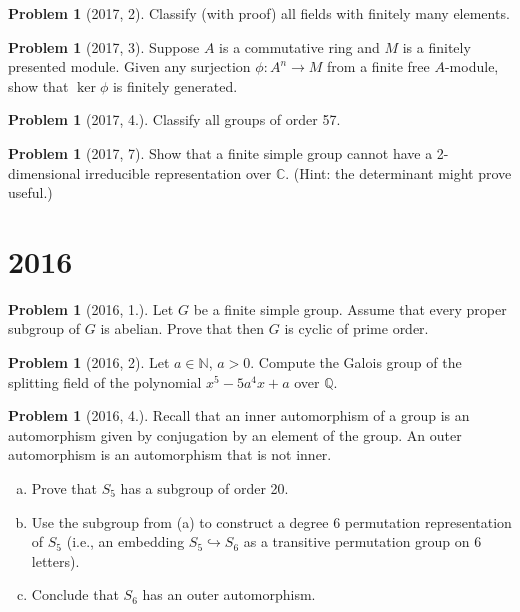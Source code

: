 \documentclass{article}
\newcommand{\<}{\langle} %
\renewcommand{\>}{\rangle} %
\theoremstyle{plain}
\theoremstyle{remark}
\theoremstyle{definition}
\newtheorem{examproblem}[equation]{Problem}
\begin{document}
\begin{examproblem}[2017, 2]
	Classify (with proof) all fields with finitely many elements.
\end{examproblem}

\begin{examproblem}[2017, 3]
	Suppose $A$ is a commutative ring and $M$ is a finitely presented module.
	Given any surjection $\phi:A^n\rightarrow M$ from a finite free
	$A$-module, show that $\ker\phi$ is finitely generated.
\end{examproblem}

\begin{examproblem}[2017, 4.]
	Classify all groups of order 57.
\end{examproblem}

\begin{examproblem}[2017, 7]
	Show that a finite simple group cannot have a 2-dimensional irreducible
	representation over $\mathbb C$. (Hint: the determinant might prove useful.)
\end{examproblem}

\pagebreak

\section{2016}
\begin{examproblem}[2016, 1.]
	Let $G$ be a finite simple group. Assume that every proper subgroup
	of $G$ is abelian. Prove that then $G$ is cyclic of prime order.
\end{examproblem}


\begin{examproblem}[2016, 2]
	Let $a\in\mathbb N$, $a>0$. Compute the Galois group of the splitting field
	of the polynomial $x^5-5a^4x+a$ over $\mathbb Q$.
\end{examproblem}

\begin{examproblem}[2016, 4.] 
  Recall that an inner automorphism of a group is an automorphism given by conjugation by an element of the group. An outer automorphism is an automorphism that is not inner.
	\begin{enumerate}[(a)]
		\item Prove that $S_5$ has a subgroup of order 20.
		\item Use the subgroup from (a) to construct a degree 6 permutation representation of $S_5$ (i.e., an embedding $S_5 \hookrightarrow S_6$ as a transitive permutation group on 6 letters).
		\item Conclude that $S_6$ has an outer automorphism.
	\end{enumerate}
\end{examproblem}
\end{document}
